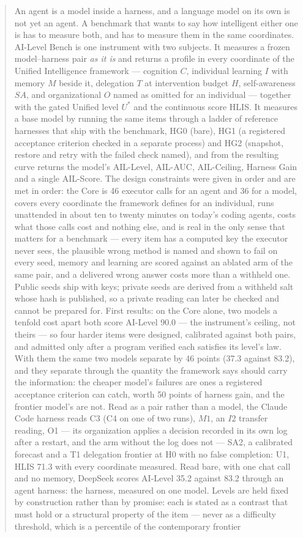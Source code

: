 \begin{abstract}
An agent is a model inside a harness, and a language model on its own is not yet an agent. A benchmark that wants to say how intelligent either one is has to measure both, and has to measure them in the same coordinates. AI-Level Bench is one instrument with two subjects. It measures a frozen model--harness pair \emph{as it is} and returns a profile in every coordinate of the Unified Intelligence framework \citep{yang2026unified} --- cognition $C$, individual learning $I$ with memory $M$ beside it, delegation $T$ at intervention budget $H$, self-awareness $SA$, and organizational $O$ named as omitted for an individual --- together with the gated Unified level $U^{*}$ and the continuous score HLIS. It measures a base model by running the same items through a ladder of reference harnesses that ship with the benchmark, HG0 (bare), HG1 (a registered acceptance criterion checked in a separate process) and HG2 (snapshot, restore and retry with the failed check named), and from the resulting curve returns the model's AIL-Level, AIL-AUC, AIL-Ceiling, Harness Gain and a single AIL-Score. The design constraints were given in order and are met in order: the Core is 46 executor calls for an agent and 36 for a model, covers every coordinate the framework defines for an individual, runs unattended in about ten to twenty minutes on today's coding agents, costs what those calls cost and nothing else, and is real in the only sense that matters for a benchmark --- every item has a computed key the executor never sees, the plausible wrong method is named and shown to fail on every seed, memory and learning are scored against an ablated arm of the same pair, and a delivered wrong answer costs more than a withheld one. Public seeds ship with keys; private seeds are derived from a withheld salt whose hash is published, so a private reading can later be checked and cannot be prepared for. First results: on the Core alone, two models a tenfold cost apart both score AI-Level 90.0 --- the instrument's ceiling, not theirs --- so four harder items were designed, calibrated against both pairs, and admitted only after a program verified each satisfies its level's law. With them the same two models separate by 46 points (37.3 against 83.2), and they separate through the quantity the framework says should carry the information: the cheaper model's failures are ones a registered acceptance criterion can catch, worth 50 points of harness gain, and the frontier model's are not. Read as a pair rather than a model, the Claude Code harness reads C3 (C4 on one of two runs), $M1$, an $I2$ transfer reading, O1 --- its organization applies a decision recorded in its own log after a restart, and the arm without the log does not --- SA2, a calibrated forecast and a T1 delegation frontier at H0 with no false completion: U1, HLIS 71.3 with every coordinate measured. Read bare, with one chat call and no memory, DeepSeek scores AI-Level 35.2 against 83.2 through an agent harness: the harness, measured on one model. Levels are held fixed by construction rather than by promise: each is stated as a contrast that must hold or a structural property of the item --- never as a difficulty threshold, which is a percentile of the contemporary frontier 
\end{abstract}

